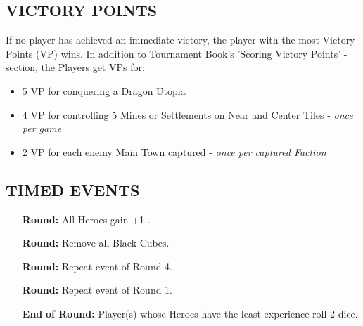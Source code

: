 \begin{multicols*}{2}
\subsection*{\MakeUppercase{Victory Points}}
If no player has achieved an immediate victory, the player with the most Victory Points (VP) wins. In addition to Tournament Book's 'Scoring Victory Points' -section, the Players get VPs for:

\begin{itemize}
 \item 5 VP for conquering a Dragon Utopia
 \item 4 VP for controlling 5 Mines or Settlements on Near and Center Tiles - \textit{once per game}
 \item 2 VP for each enemy Main Town captured - \textit{once per captured Faction}
\end{itemize}

\subsection*{\MakeUppercase{Timed Events}}

\begin{itemize}
  \item[\textbf{\nth{1}}] \textbf{Round:} All Heroes gain +1 .
  \item[\textbf{\nth{4}}] \textbf{Round:} Remove all Black Cubes. %
  \item[\textbf{\nth{8}}] \textbf{Round:} Repeat event of Round 4.
  \item[\textbf{\nth{9}}] \textbf{Round:} Repeat event of Round 1.
  \item[\textbf{End}] \textbf{of  Round:} Player(s) whose Heroes have the least experience roll 2  dice.
\end{itemize}


\end{multicols*}
